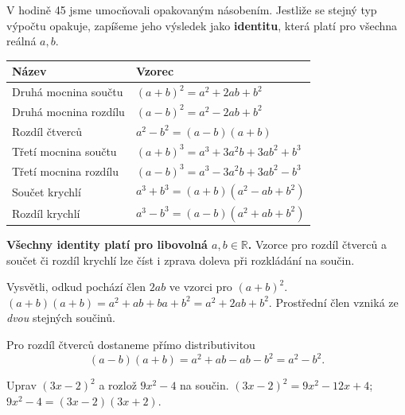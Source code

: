 \documentclass[11pt,a4paper]{article}
\begin{document}
V hodině 45 jsme umocňovali opakovaným násobením. Jestliže se stejný typ výpočtu opakuje, zapíšeme jeho výsledek jako \textbf{identitu}, která platí pro všechna reálná $a,b$.
\begin{center}
\small
\renewcommand{\arraystretch}{1.55}
\begin{tabularx}{\linewidth}{@{}>{\raggedright\arraybackslash}p{38mm}X@{}}
\toprule
\textbf{Název} & \textbf{Vzorec}\\
\midrule
Druhá mocnina součtu & $(a+b)^2=a^2+2ab+b^2$\\
Druhá mocnina rozdílu & $(a-b)^2=a^2-2ab+b^2$\\
Rozdíl čtverců & $a^2-b^2=(a-b)(a+b)$\\
Třetí mocnina součtu & $(a+b)^3=a^3+3a^2b+3ab^2+b^3$\\
Třetí mocnina rozdílu & $(a-b)^3=a^3-3a^2b+3ab^2-b^3$\\
Součet krychlí & $a^3+b^3=(a+b)(a^2-ab+b^2)$\\
Rozdíl krychlí & $a^3-b^3=(a-b)(a^2+ab+b^2)$\\
\bottomrule
\end{tabularx}
\end{center}
\normalsize
\textbf{Všechny identity platí pro libovolná $a,b\in\mathbb R$.} Vzorce pro rozdíl čtverců a součet či rozdíl krychlí lze číst i zprava doleva při rozkládání na součin.
\begin{prikladReseniBox}[title={Příklad 1}]
Vysvětli, odkud pochází člen $2ab$ ve vzorci pro $(a+b)^2$.
\tcblower
$(a+b)(a+b)=a^2+ab+ba+b^2=a^2+2ab+b^2$. Prostřední člen vzniká ze \emph{dvou} stejných součinů.
\end{prikladReseniBox}
Pro rozdíl čtverců dostaneme přímo distributivitou
\[(a-b)(a+b)=a^2+ab-ab-b^2=a^2-b^2.\]
\begin{prikladReseniBox}[title={Příklad 2}]
Uprav $(3x-2)^2$ a rozlož $9x^2-4$ na součin.
\tcblower
$(3x-2)^2=9x^2-12x+4$; $9x^2-4=(3x-2)(3x+2)$.
\end{prikladReseniBox}
\end{document}
